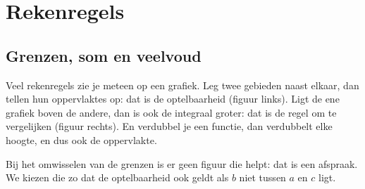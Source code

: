 \section{Rekenregels}

\subsection{Grenzen, som en veelvoud}

Veel rekenregels zie je meteen op een grafiek. Leg twee gebieden naast elkaar, dan tellen hun oppervlaktes op: dat is de optelbaarheid (figuur links). Ligt de ene grafiek boven de andere, dan is ook de integraal groter: dat is de regel om te vergelijken (figuur rechts). En verdubbel je een functie, dan verdubbelt elke hoogte, en dus ook de oppervlakte.


Bij het omwisselen van de grenzen is er geen figuur die helpt: dat is een afspraak. We kiezen die zo dat de optelbaarheid ook geldt als $b$ niet tussen $a$ en $c$ ligt.


